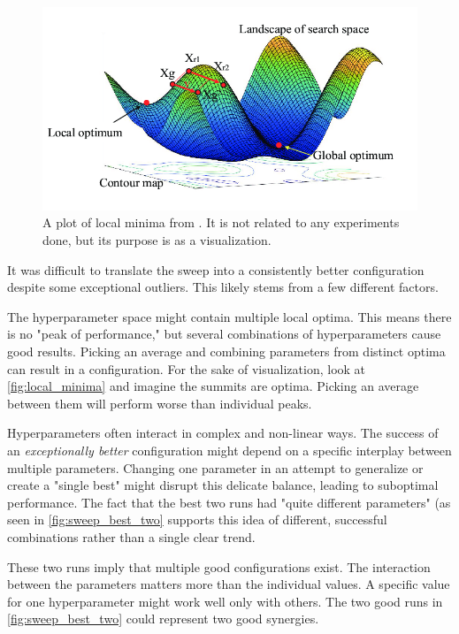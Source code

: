 \begin{figure}
    \centering
    \includegraphics[width=0.75\linewidth]{figures/local_minima.png}
    \caption{A plot of local minima from \cite{fig:multiple_local_minima}. It is not related to any experiments done, but its purpose is as a visualization.}
    \label{fig:local_minima}
\end{figure}

It was difficult to translate the sweep into a consistently better configuration despite some exceptional outliers. This likely stems from a few different factors. 

The hyperparameter space might contain multiple local optima. This means there is no "peak of performance," but several combinations of hyperparameters cause good results. Picking an average and combining parameters from distinct optima can result in a configuration. For the sake of visualization, look at \autoref{fig:local_minima} and imagine the summits are optima. Picking an average between them will perform worse than individual peaks. 

Hyperparameters often interact in complex and non-linear ways. The success of an \emph{exceptionally better} configuration might depend on a specific interplay between multiple parameters. Changing one parameter in an attempt to generalize or create a "single best" might disrupt this delicate balance, leading to suboptimal performance. The fact that the best two runs had "quite different parameters" (as seen in \autoref{fig:sweep_best_two} supports this idea of different, successful combinations rather than a single clear trend.


These two runs imply that multiple good configurations exist. The interaction between the parameters matters more than the individual values. A specific value for one hyperparameter might work well only with others. The two good runs in \autoref{fig:sweep_best_two} could represent two good synergies. 


